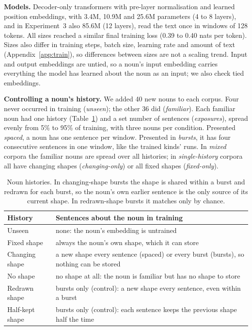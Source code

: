\documentclass[11pt]{article}
\begin{document}
\textbf{Models.} Decoder-only transformers with pre-layer normalisation and learned position embeddings, with 3.4M, 10.9M and 25.6M parameters (4 to 8 layers), and in Experiment~3 also 85.6M (12 layers), read the text once in windows of 128 tokens. All sizes reached a similar final training loss (0.39 to 0.40 nats per token). Sizes also differ in training steps, batch size, learning rate and amount of text (Appendix~\ref{app:train}), so differences between sizes are not a scaling trend. Input and output embeddings are untied, so a noun's input embedding carries everything the model has learned about the noun as an input; we also check tied embeddings.

\textbf{Controlling a noun's history.} We added 40 new nouns to each corpus. Four never occurred in training (\emph{unseen}); the other 36 did (\emph{familiar}). Each familiar noun had one history (Table~\ref{tab:design}) and a set number of sentences (\emph{exposures}), spread evenly from 5\% to 95\% of training, with three nouns per condition. Presented \emph{spaced}, a noun has one sentence per window. Presented in \emph{bursts}, it has four consecutive sentences in one window, like the trained kinds' runs. In \emph{mixed} corpora the familiar nouns are spread over all histories; in \emph{single-history} corpora all have changing shapes (\emph{changing-only}) or all fixed shapes (\emph{fixed-only}).

\begin{table}[t]
\centering
\small
\setlength{\tabcolsep}{3pt}
\begin{tabular}{@{}p{}p{}@{}}
\toprule
History & Sentences about the noun in training \\
\midrule
Unseen & none: the noun's embedding is untrained \\
Fixed shape & always the noun's own shape, which it can store \\
Changing shape & a new shape every sentence (spaced) or every burst (bursts), so nothing can be stored \\
No shape & no shape at all: the noun is familiar but has no shape to store \\
Redrawn shape & bursts only (control): a new shape every sentence, even within a burst \\
Half-kept shape & bursts only (control): each sentence keeps the previous shape half the time \\
\bottomrule
\end{tabular}
\caption{Noun histories. In changing-shape bursts the shape is shared within a burst and redrawn for each burst, so the noun's own earlier sentence is the only source of its current shape. In redrawn-shape bursts it matches only by chance.}
\label{tab:design}
\end{table}
\end{document}
